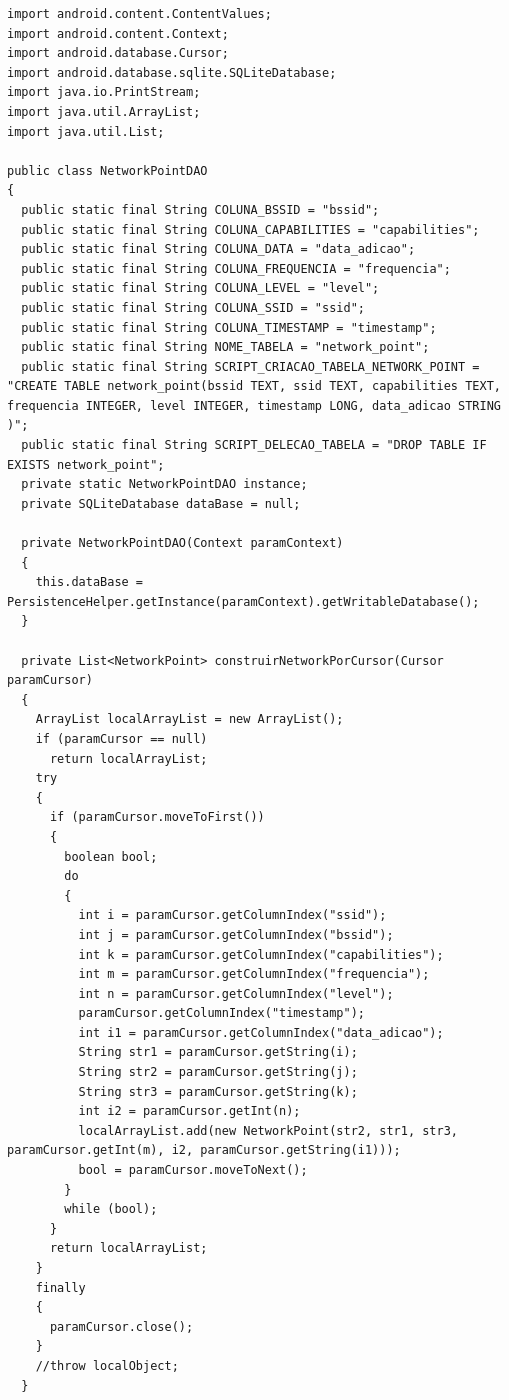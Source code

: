 \documentclass[12pt, %
openright, 
oneside, %
a4paper,    %
brazil]{facom-ufu-abntex2}
\begin{document}
\begin{anexosenv}
\begin{lstlisting}
import android.content.ContentValues;
import android.content.Context;
import android.database.Cursor;
import android.database.sqlite.SQLiteDatabase;
import java.io.PrintStream;
import java.util.ArrayList;
import java.util.List;

public class NetworkPointDAO
{
  public static final String COLUNA_BSSID = "bssid";
  public static final String COLUNA_CAPABILITIES = "capabilities";
  public static final String COLUNA_DATA = "data_adicao";
  public static final String COLUNA_FREQUENCIA = "frequencia";
  public static final String COLUNA_LEVEL = "level";
  public static final String COLUNA_SSID = "ssid";
  public static final String COLUNA_TIMESTAMP = "timestamp";
  public static final String NOME_TABELA = "network_point";
  public static final String SCRIPT_CRIACAO_TABELA_NETWORK_POINT = "CREATE TABLE network_point(bssid TEXT, ssid TEXT, capabilities TEXT, frequencia INTEGER, level INTEGER, timestamp LONG, data_adicao STRING )";
  public static final String SCRIPT_DELECAO_TABELA = "DROP TABLE IF EXISTS network_point";
  private static NetworkPointDAO instance;
  private SQLiteDatabase dataBase = null;

  private NetworkPointDAO(Context paramContext)
  {
    this.dataBase = PersistenceHelper.getInstance(paramContext).getWritableDatabase();
  }

  private List<NetworkPoint> construirNetworkPorCursor(Cursor paramCursor)
  {
    ArrayList localArrayList = new ArrayList();
    if (paramCursor == null)
      return localArrayList;
    try
    {
      if (paramCursor.moveToFirst())
      {
        boolean bool;
        do
        {
          int i = paramCursor.getColumnIndex("ssid");
          int j = paramCursor.getColumnIndex("bssid");
          int k = paramCursor.getColumnIndex("capabilities");
          int m = paramCursor.getColumnIndex("frequencia");
          int n = paramCursor.getColumnIndex("level");
          paramCursor.getColumnIndex("timestamp");
          int i1 = paramCursor.getColumnIndex("data_adicao");
          String str1 = paramCursor.getString(i);
          String str2 = paramCursor.getString(j);
          String str3 = paramCursor.getString(k);
          int i2 = paramCursor.getInt(n);
          localArrayList.add(new NetworkPoint(str2, str1, str3, paramCursor.getInt(m), i2, paramCursor.getString(i1)));
          bool = paramCursor.moveToNext();
        }
        while (bool);
      }
      return localArrayList;
    }
    finally
    {
      paramCursor.close();
    }
    //throw localObject;
  }


\end{lstlisting}
\end{anexosenv}
\end{document}
